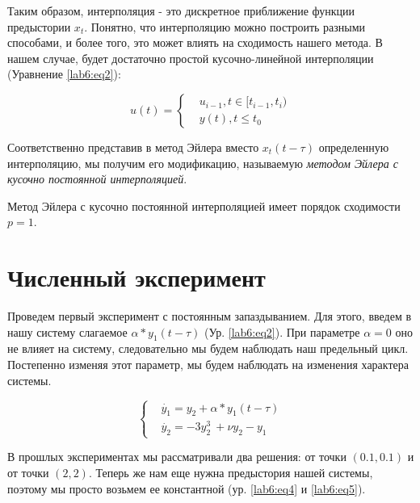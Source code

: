 Таким образом, интерполяция - это дискретное приближение
функции предыстории $x_t$. Понятно, что интерполяцию можно
построить разными способами, и более того, это может влиять
на сходимость нашего метода. В нашем случае, будет достаточно
простой кусочно-линейной интерполяции (Уравнение \eqref{lab6:eq2}):

\begin{equation}\label{lab6:eq2}
    u(t) = \begin{cases}
        &u_{i-1}, t \in [t_{i-1}, t_i) \\
        &y(t), t \leq t_0
    \end{cases}
\end{equation}

Соответственно представив в метод Эйлера вместо $x_t(t - \tau)$
определенную интерполяцию, мы получим его модификацию, называемую
\textit{методом Эйлера с кусочно постоянной интерполяцией}.

\begin{theorem}
    Метод Эйлера с кусочно постоянной интерполяцией имеет порядок
    сходимости $p = 1$.
\end{theorem}



\section{Численный эксперимент}

Проведем первый эксперимент с постоянным запаздыванием.
Для этого, введем в нашу систему слагаемое
$\alpha * y_1(t-\tau)$ (Ур. \eqref{lab6:eq2}). При параметре
$\alpha = 0$ оно не влияет на систему, следовательно мы будем
наблюдать наш предельный цикл. Постепенно изменяя этот параметр,
мы будем наблюдать на изменения характера системы.

\begin{equation}\label{lab6:eq3}
\begin{cases}
    &\dot{y_1} = y_2 + \alpha * y_1(t-\tau)\\
    &\dot{y_2} = -3y_2^3\ + \nu y_2 - y_1
\end{cases}
\end{equation}

В прошлых экспериментах мы рассматривали два решения: от точки
$(0.1, 0.1)$ и от точки $(2, 2)$. Теперь же нам еще нужна
предыстория нашей системы, поэтому мы просто возьмем ее константной
(ур. \eqref{lab6:eq4} и \eqref{lab6:eq5}).

